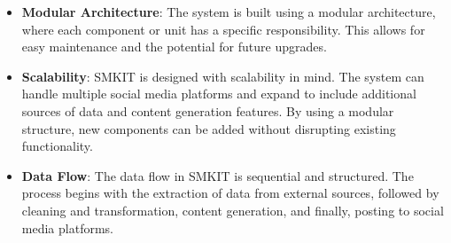 \begin{itemize}
    \item \textbf{Modular Architecture}: The system is built using a modular architecture, where each component or unit has a specific responsibility. This allows for easy maintenance and the potential for future upgrades. 
    
    
    \item \textbf{Scalability}: SMKIT is designed with scalability in mind. The system can handle multiple social media platforms and expand to include additional sources of data and content generation features. By using a modular structure, new components can be added without disrupting existing functionality.
    
    \item \textbf{Data Flow}: The data flow in SMKIT is sequential and structured. The process begins with the extraction of data from external sources, followed by cleaning and transformation, content generation, and finally, posting to social media platforms. 
\end{itemize}
